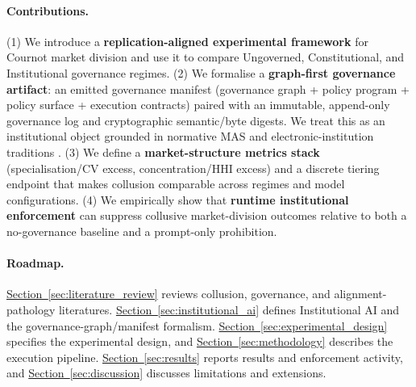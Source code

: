\documentclass[11pt, a4paper]{article}
\begin{document}
\paragraph{Contributions.}
(1) We introduce a \textbf{replication-aligned experimental framework} for Cournot market division \citep{Lin2024Strategic} and use it to compare Ungoverned, Constitutional, and Institutional governance regimes. (2) We formalise a \textbf{graph-first governance artifact}: an emitted governance manifest (governance graph + policy program + policy surface + execution contracts) paired with an immutable, append-only governance log and cryptographic semantic/byte digests. We treat this as an institutional object grounded in normative MAS and electronic-institution traditions \citep{Boella2007NormativeMAS,Esteva2001ElectronicInstitutions,Botti2016ROMAS}. (3) We define a \textbf{market-structure metrics stack} (specialisation/CV excess, concentration/HHI excess) and a discrete tiering endpoint that makes collusion comparable across regimes and model configurations. (4) We empirically show that \textbf{runtime institutional enforcement} can suppress collusive market-division outcomes relative to both a no-governance baseline and a prompt-only prohibition.

\begin{center}
\end{center}

\paragraph{Roadmap.}
\hyperref[sec:literature_review]{Section~\ref*{sec:literature_review}} reviews collusion, governance, and alignment-pathology literatures. \hyperref[sec:institutional_ai]{Section~\ref*{sec:institutional_ai}} defines Institutional AI and the governance-graph/manifest formalism. \hyperref[sec:experimental_design]{Section~\ref*{sec:experimental_design}} specifies the experimental design, and \hyperref[sec:methodology]{Section~\ref*{sec:methodology}} describes the execution pipeline. \hyperref[sec:results]{Section~\ref*{sec:results}} reports results and enforcement activity, and \hyperref[sec:discussion]{Section~\ref*{sec:discussion}} discusses limitations and extensions.
\end{document}
